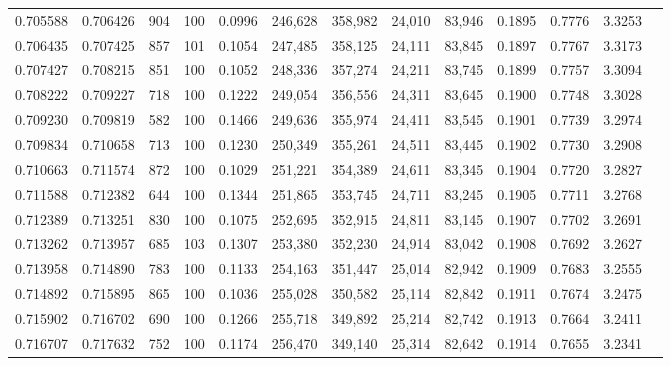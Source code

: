 \begin{tabular}{rrrrrrrrrrrrr}
0.705588 & 0.706426 &   904 & 100 &                                     0.0996 & 246,628 & 358,982 &  24,010 &  83,946 & 0.1895 & 0.7776 & 3.3253 \\
0.706435 & 0.707425 &   857 & 101 &                                     0.1054 & 247,485 & 358,125 &  24,111 &  83,845 & 0.1897 & 0.7767 & 3.3173 \\
0.707427 & 0.708215 &   851 & 100 &                                     0.1052 & 248,336 & 357,274 &  24,211 &  83,745 & 0.1899 & 0.7757 & 3.3094 \\
0.708222 & 0.709227 &   718 & 100 &                                     0.1222 & 249,054 & 356,556 &  24,311 &  83,645 & 0.1900 & 0.7748 & 3.3028 \\
0.709230 & 0.709819 &   582 & 100 &                                     0.1466 & 249,636 & 355,974 &  24,411 &  83,545 & 0.1901 & 0.7739 & 3.2974 \\
0.709834 & 0.710658 &   713 & 100 &                                     0.1230 & 250,349 & 355,261 &  24,511 &  83,445 & 0.1902 & 0.7730 & 3.2908 \\
0.710663 & 0.711574 &   872 & 100 &                                     0.1029 & 251,221 & 354,389 &  24,611 &  83,345 & 0.1904 & 0.7720 & 3.2827 \\
0.711588 & 0.712382 &   644 & 100 &                                     0.1344 & 251,865 & 353,745 &  24,711 &  83,245 & 0.1905 & 0.7711 & 3.2768 \\
0.712389 & 0.713251 &   830 & 100 &                                     0.1075 & 252,695 & 352,915 &  24,811 &  83,145 & 0.1907 & 0.7702 & 3.2691 \\
0.713262 & 0.713957 &   685 & 103 &                                     0.1307 & 253,380 & 352,230 &  24,914 &  83,042 & 0.1908 & 0.7692 & 3.2627 \\
0.713958 & 0.714890 &   783 & 100 &                                     0.1133 & 254,163 & 351,447 &  25,014 &  82,942 & 0.1909 & 0.7683 & 3.2555 \\
0.714892 & 0.715895 &   865 & 100 &                                     0.1036 & 255,028 & 350,582 &  25,114 &  82,842 & 0.1911 & 0.7674 & 3.2475 \\
0.715902 & 0.716702 &   690 & 100 &                                     0.1266 & 255,718 & 349,892 &  25,214 &  82,742 & 0.1913 & 0.7664 & 3.2411 \\
0.716707 & 0.717632 &   752 & 100 &                                     0.1174 & 256,470 & 349,140 &  25,314 &  82,642 & 0.1914 & 0.7655 & 3.2341 \\

\end{tabular}
